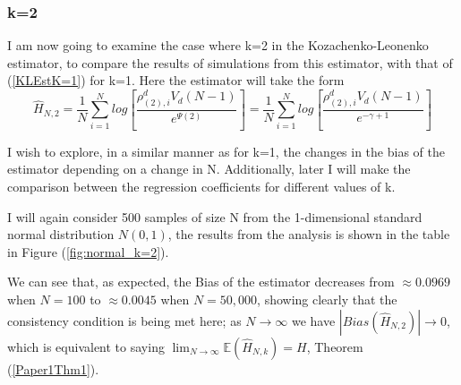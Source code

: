 \documentclass{article}
\begin{document}
\subsubsection{k=2}

I am now going to examine the case where k=2 in the Kozachenko-Leonenko estimator, to compare the results of simulations from this estimator, with that of (\ref{KLEstK=1}) for k=1. Here the estimator will take the form
\begin{equation}
\hat{H}_{N, 2} = \frac{1}{N} \sum_{i=1}^{N} log \left[ \frac{\rho_{(2),i}^{d} V_{d} (N-1)}{e^{\Psi(2)}} \right] = \frac{1}{N} \sum_{i=1}^{N} log \left[ \frac{\rho_{(2),i}^{d} V_{d} (N-1)}{e^{-\gamma + 1}} \right]
\end{equation}

I wish to explore, in a similar manner as for k=1, the changes in the bias of the estimator depending on a change in N. Additionally, later I will make the comparison between the regression coefficients for different values of k.

I will again consider 500 samples of size N from the 1-dimensional standard normal distribution $N(0, 1)$, the results from the analysis is shown in the table in Figure (\ref{fig:normal_k=2}).

We can see that, as expected, the Bias of the estimator decreases from $\approx 0.0969$ when $N=100$ to $\approx 0.0045$ when $N=50,000$, showing clearly that the consistency condition is being met here; as $N \to \infty$ we have $|Bias(\hat{H}_{N, 2})| \to 0$, which is equivalent to saying $\lim_{N \to \infty} \mathbb{E} (\hat{H}_{N, k}) = H$, Theorem (\ref{Paper1Thm1}).
\end{document}
